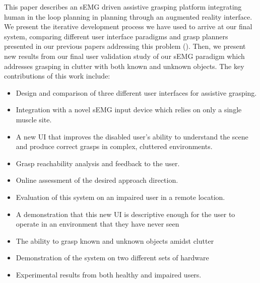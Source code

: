 This paper describes an sEMG driven assistive grasping platform integrating human in the loop planning in planning through an augmented reality interface. We present the iterative development process we have used to arrive at our final system, comparing different user interface paradigms and grasp planners presented in our previous papers addressing this problem (\cite{Weisz2012c,Weisz2013a,Weisz2014}). Then, we present new results from our final user validation study of our sEMG paradigm which addresses grasping in clutter with both known and unknown objects.
The key contributions of this work include:
\begin{itemize}

\item 
Design and comparison of three different user interfaces for assistive grasping.
\item
Integration  with  a  novel  sEMG  input  device  which  relies  on
only  a  single  muscle  site.
\item
A  new  UI  that  improves  the
disabled  user’s  ability  to  understand  the  scene  and  produce
correct grasps in complex, cluttered environments.
\item
Grasp reachability analysis and feedback to the user.
\item
Online assessment of the desired approach direction.
\item
Evaluation of this system on an impaired user in a remote location.
\item
A demonstration
that this new UI is descriptive enough for the user to operate
in an environment that they have never seen
\item 
The ability to grasp known and unknown objects amidst clutter
\item
Demonstration of the system on two different sets of hardware
\item 
Experimental results from both healthy and impaired users.
\end{itemize}
